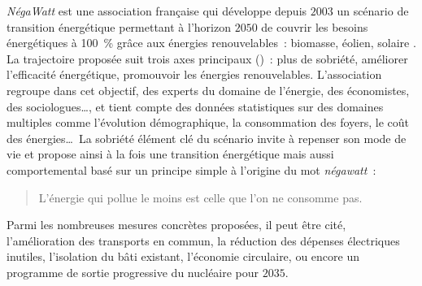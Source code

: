\textit{NégaWatt} est une association française qui développe depuis $2003$ un scénario de
transition énergétique permettant à l’horizon $2050$ de couvrir les besoins énergétiques à
\SI{100}{\percent} grâce aux énergies renouvelables~: biomasse, éolien, solaire \parencite{negaWatt2017}. La
trajectoire proposée suit trois axes principaux ()~: plus de
sobriété, améliorer l’efficacité énergétique, promouvoir les énergies renouvelables.
L’association regroupe dans cet objectif, des experts du domaine de l’énergie, des
économistes, des sociologues\dots, et tient compte des données statistiques sur des
domaines multiples comme l’évolution démographique, la consommation des foyers, le coût
des énergies\dots\ La sobriété élément clé du scénario invite à repenser son mode de vie et
propose ainsi à la fois une transition énergétique mais aussi comportemental basé sur un
principe simple à l’origine du mot \textit{négawatt}~:
\blockquote{L’énergie qui pollue le moins est celle que l’on ne consomme pas.}
Parmi les nombreuses mesures concrètes proposées, il peut être cité, l’amélioration des transports en
commun, la réduction des dépenses électriques inutiles, l’isolation du bâti existant,
l’économie circulaire, ou encore un programme de sortie progressive du nucléaire pour
$2035$.

